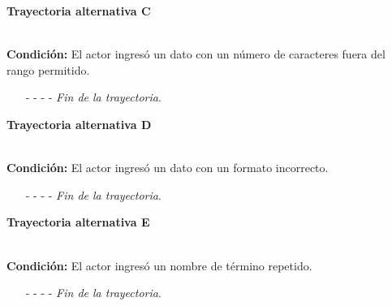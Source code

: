 \hypertarget{CU6-1:TAC}{\textbf{Trayectoria alternativa C}}\\
\noindent \textbf{Condición:} El actor ingresó un dato con un número de caracteres fuera del rango permitido.
\begin{enumerate}
	\UCpaso[\UCsist] Muestra el mensaje  señalando el campo que presenta el error en la pantalla .
	\UCpaso Regresa al paso \ref{CU6.1-P3} de la trayectoria principal.
	\item[- -] - - {\em {Fin de la trayectoria}}.%
\end{enumerate}
\hypertarget{CU6-1:TAD}{\textbf{Trayectoria alternativa D}}\\
\noindent \textbf{Condición:} El actor ingresó un dato con un formato incorrecto.
\begin{enumerate}
	\UCpaso[\UCsist] Muestra el mensaje  señalando el campo que presenta el error en la pantalla .
	\UCpaso Regresa al paso \ref{CU6.1-P3} de la trayectoria principal.
	\item[- -] - - {\em {Fin de la trayectoria}}.
\end{enumerate}
\hypertarget{CU6-1:TAE}{\textbf{Trayectoria alternativa E}}\\
\noindent \textbf{Condición:} El actor ingresó un nombre de término repetido.
\begin{enumerate}
	\UCpaso[\UCsist] Muestra el mensaje  señalando el campo que presenta la duplicidad en la pantalla .
	\UCpaso Regresa al paso \ref{CU6.1-P3} de la trayectoria principal.
	\item[- -] - - {\em {Fin de la trayectoria}}.
\end{enumerate}


